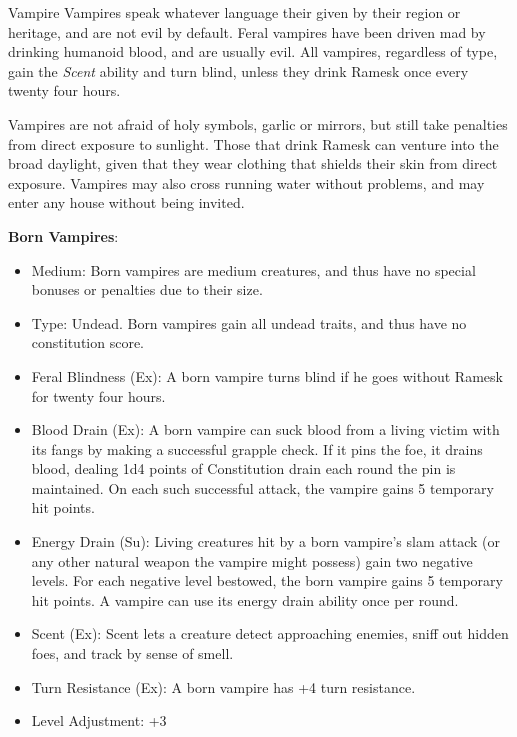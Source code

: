\begin{35e}{Vampire}
  Vampires speak whatever language their given by their region or heritage,
  and are not evil by default. Feral vampires have been driven mad by drinking
  humanoid blood, and are usually evil. All vampires, regardless of type, gain
  the \emph{Scent} ability and turn blind, unless they drink Ramesk once every
  twenty four hours.

  Vampires are not afraid of holy symbols, garlic or mirrors, but still take
  penalties from direct exposure to sunlight. Those that drink Ramesk can
  venture into the broad daylight, given that they wear clothing that shields
  their skin from direct exposure. Vampires may also cross running water
  without problems, and may enter any house without being invited.

  \textbf{Born Vampires}:\\
  \begin{itemize}[noitemsep]
    \item Medium: Born vampires are medium creatures, and thus have no special
      bonuses or penalties due to their size.
    \item Type: Undead. Born vampires gain all undead traits, and thus have no
      constitution score.
    \item Feral Blindness (Ex): A born vampire turns blind if he goes without
      Ramesk for twenty four hours.
    \item Blood Drain (Ex): A born vampire can suck blood from a living victim
      with its fangs by making a successful grapple check. If it pins the foe,
      it drains blood, dealing 1d4 points of Constitution drain each round the
      pin is maintained. On each such successful attack, the vampire gains 5
      temporary hit points.
    \item Energy Drain (Su): Living creatures hit by a born vampire's slam
      attack (or any other natural weapon the vampire might possess) gain two
      negative levels. For each negative level bestowed, the born vampire
      gains 5 temporary hit points. A vampire can use its energy drain ability
      once per round.
    \item Scent (Ex): Scent lets a creature detect approaching enemies, sniff
      out hidden foes, and track by sense of smell.
    \item Turn Resistance (Ex): A born vampire has +4 turn resistance.
    \item Level Adjustment: +3
  \end{itemize}
\end{35e}
